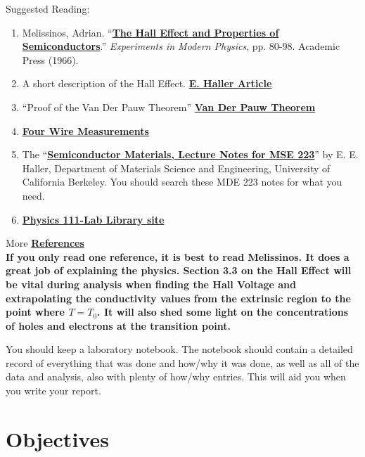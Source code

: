 \documentclass{../lab}
\newcommand{\VanDerPauwTheorem}{http://experimentationlab.berkeley.edu/node/105}
\newcommand{\TheHallEffectandPropertiesofSemiconductors}{http://physics111.lib.berkeley.edu/Physics111/Reprints/SHE/SHE_Melissinos_properties_of_semiconductors_pg_80-98_1966.pdf}
\newcommand{\EHallerArticle}{http://physics111.lib.berkeley.edu/Physics111/Reprints/SHE/24-Haller.pdf}
\newcommand{\FourWireMeasurements}{http://physics111.lib.berkeley.edu/Physics111/Reprints/SHE/19-Four_Wire_Measurement.pdf}
\newcommand{\SemiconductorMaterialsLectureNotes}{http://physics111.lib.berkeley.edu/Physics111/Reprints/SHE/Semiconductor\%20Materials\%20Notes\%20MSE\%20223\%20Haller.pdf}
\begin{document}
\noindent Suggested Reading:

\begin{enumerate}
    \item Melissinos, Adrian. ``\href{\TheHallEffectandPropertiesofSemiconductors}{\textbf{The Hall Effect and Properties of Semiconductors}}.'' \emph{Experiments in Modern Physics}, pp. 80-98. Academic Press (1966).

    \item A short description of the Hall Effect. \href{\EHallerArticle}{\textbf{E. Haller Article}}

    \item ``Proof of the Van Der Pauw Theorem'' \href{\VanDerPauwTheorem}{\textbf{Van Der Pauw Theorem}}

    \item \href{\FourWireMeasurements}{\textbf{Four Wire Measurements}}

    \item The ``\href{\SemiconductorMaterialsLectureNotes}{\textbf{Semiconductor Materials, Lecture Notes for MSE 223}}'' by E. E. Haller, Department of Materials Science and Engineering, University of California Berkeley. You should search these MDE 223 notes for what you need.

    \item \href{\LabReprints}{\textbf{Physics 111-Lab Library site}}
\end{enumerate}

\noindent More \hyperref[references]{\textbf{References}} \\

\noindent\textbf{If you only read one reference, it is best to read Melissinos. It does a great job of explaining the physics. Section 3.3 on the Hall Effect will be vital during analysis when finding the Hall Voltage and extrapolating the conductivity values from the extrinsic region to the point where $T = T_0$. It will also shed some light on the concentrations of holes and electrons at the transition point.}

You should keep a laboratory notebook. The notebook should contain a detailed record of everything that was done and how/why it was done, as well as all of the data and analysis, also with plenty of how/why entries. This will aid you when you write your report.

\section{Objectives}
\end{document}
